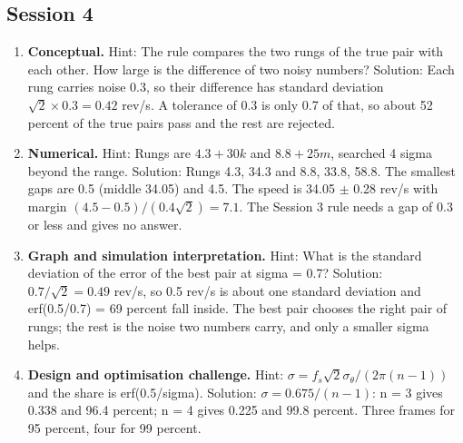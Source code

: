 \documentclass[11pt,a4paper]{article}
\begin{document}
\subsection*{Session 4}
\begin{enumerate}[nosep]
\item \textbf{Conceptual.} Hint: The rule compares the two rungs of the true pair with each other. How large is the difference of two noisy numbers? Solution: Each rung carries noise 0.3, so their difference has standard deviation $\sqrt2\times0.3=0.42$ rev/s. A tolerance of 0.3 is only 0.7 of that, so about 52 percent of the true pairs pass and the rest are rejected.
\item \textbf{Numerical.} Hint: Rungs are $4.3+30k$ and $8.8+25m$, searched 4 sigma beyond the range. Solution: Rungs 4.3, 34.3 and 8.8, 33.8, 58.8. The smallest gaps are 0.5 (middle 34.05) and 4.5. The speed is 34.05 $\pm$ 0.28 rev/s with margin $(4.5-0.5)/(0.4\sqrt2)=7.1$. The Session 3 rule needs a gap of 0.3 or less and gives no answer.
\item \textbf{Graph and simulation interpretation.} Hint: What is the standard deviation of the error of the best pair at sigma = 0.7? Solution: $0.7/\sqrt2=0.49$ rev/s, so 0.5 rev/s is about one standard deviation and erf(0.5/0.7) = 69 percent fall inside. The best pair chooses the right pair of rungs; the rest is the noise two numbers carry, and only a smaller sigma helps.
\item \textbf{Design and optimisation challenge.} Hint: $\sigma=f_s\sqrt2\sigma_\theta/(2\pi(n-1))$ and the share is erf(0.5/sigma). Solution: $\sigma=0.675/(n-1)$: n = 3 gives 0.338 and 96.4 percent; n = 4 gives 0.225 and 99.8 percent. Three frames for 95 percent, four for 99 percent.
\end{enumerate}
\end{document}
